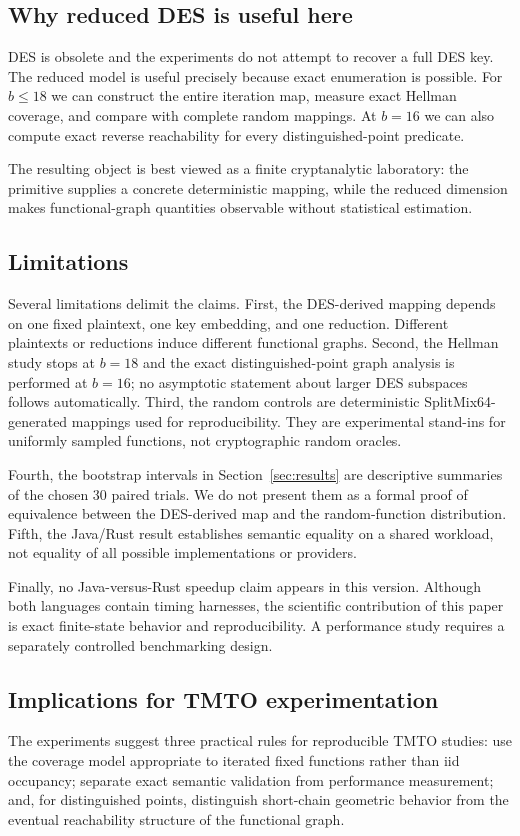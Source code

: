 \subsection{Why reduced DES is useful here}

DES is obsolete and the experiments do not attempt to recover a full DES key.
The reduced model is useful precisely because exact enumeration is possible.
For $b\leq18$ we can construct the entire iteration map, measure exact Hellman
coverage, and compare with complete random mappings. At $b=16$ we can also
compute exact reverse reachability for every distinguished-point predicate.

The resulting object is best viewed as a finite cryptanalytic laboratory: the
primitive supplies a concrete deterministic mapping, while the reduced
dimension makes functional-graph quantities observable without statistical
estimation.

\subsection{Limitations}

Several limitations delimit the claims. First, the DES-derived mapping depends
on one fixed plaintext, one key embedding, and one reduction. Different
plaintexts or reductions induce different functional graphs. Second, the
Hellman study stops at $b=18$ and the exact distinguished-point graph analysis
is performed at $b=16$; no asymptotic statement about larger DES subspaces
follows automatically. Third, the random controls are deterministic
SplitMix64-generated mappings used for reproducibility. They are experimental
stand-ins for uniformly sampled functions, not cryptographic random oracles.

Fourth, the bootstrap intervals in Section~\ref{sec:results} are descriptive
summaries of the chosen 30 paired trials. We do not present them as a formal
proof of equivalence between the DES-derived map and the random-function
distribution. Fifth, the Java/Rust result establishes semantic equality on a
shared workload, not equality of all possible implementations or providers.

Finally, no Java-versus-Rust speedup claim appears in this version. Although
both languages contain timing harnesses, the scientific contribution of this
paper is exact finite-state behavior and reproducibility. A performance study
requires a separately controlled benchmarking design.

\subsection{Implications for TMTO experimentation}

The experiments suggest three practical rules for reproducible TMTO studies:
use the coverage model appropriate to iterated fixed functions rather than iid
occupancy; separate exact semantic validation from performance measurement;
and, for distinguished points, distinguish short-chain geometric behavior from
the eventual reachability structure of the functional graph.
